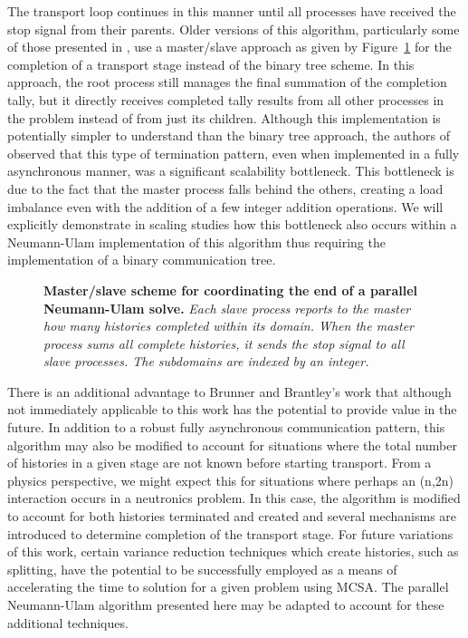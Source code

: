 The transport loop continues in this manner until all processes have
received the stop signal from their parents. Older versions of this
algorithm, particularly some of those presented in
\cite{brunner_comparison_2006}, use a master/slave approach as given
by Figure~\ref{fig:master_comm_tree} for the completion of a transport
stage instead of the binary tree scheme. In this approach, the root
process still manages the final summation of the completion tally, but
it directly receives completed tally results from all other processes
in the problem instead of from just its children. Although this
implementation is potentially simpler to understand than the binary
tree approach, the authors of \cite{brunner_comparison_2006} observed
that this type of termination pattern, even when implemented in a
fully asynchronous manner, was a significant scalability
bottleneck. This bottleneck is due to the fact that the master process
falls behind the others, creating a load imbalance even with the
addition of a few integer addition operations. We will explicitly
demonstrate in scaling studies how this bottleneck also occurs within
a Neumann-Ulam implementation of this algorithm thus requiring the
implementation of a binary communication tree.

\begin{figure}[t!]
  \begin{center}
    \scalebox{0.75}{
       }
    \caption{\textbf{Master/slave scheme for coordinating the end of a
        parallel Neumann-Ulam solve.} \textit{Each slave process
        reports to the master how many histories completed within its
        domain. When the master process sums all complete histories,
        it sends the stop signal to all slave processes. The
        subdomains are indexed by an integer.}}
  \end{center}
  \label{fig:master_comm_tree}
\end{figure}

There is an additional advantage to Brunner and Brantley's work that
although not immediately applicable to this work has the potential to
provide value in the future. In addition to a robust fully
asynchronous communication pattern, this algorithm may also be modified
to account for situations where the total number of histories in a
given stage are not known before starting transport. From a physics
perspective, we might expect this for situations where perhaps an
(n,2n) interaction occurs in a neutronics problem. In this case, the
algorithm is modified to account for both histories terminated and
created and several mechanisms are introduced to determine completion
of the transport stage. For future variations of this work, certain
variance reduction techniques which create histories, such as
splitting, have the potential to be successfully employed as a means
of accelerating the time to solution for a given problem using
MCSA. The parallel Neumann-Ulam algorithm presented here may be
adapted to account for these additional techniques.

